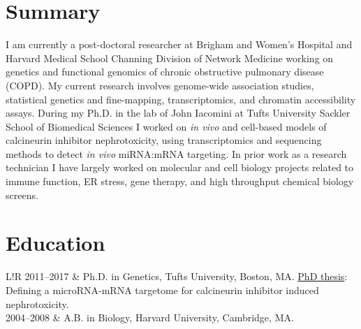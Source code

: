 \documentclass[letterpaper, 10pt]{article}
\newcommand\VRule{\color{lightgray}\vrule width 0.5pt}
\begin{document}
\section*{Summary}

I am currently a post-doctoral researcher at Brigham and Women's Hospital and Harvard Medical School Channing Division of Network Medicine working on genetics and functional genomics of chronic obstructive pulmonary disease (COPD). My current research involves genome-wide association studies, statistical genetics and fine-mapping, transcriptomics, and chromatin accessibility assays.  During my Ph.D. in the lab of John Iacomini at Tufts University Sackler School of Biomedical Sciences I worked on \textit{in vivo} and cell-based models of calcineurin inhibitor nephrotoxicity, using transcriptomics and sequencing methods to detect \textit{in vivo} miRNA:mRNA targeting. In prior work as a research technician I have largely worked on molecular and cell biology projects related to immune function, ER stress, gene therapy, and high throughput chemical biology screens. 

\section*{Education}
\begin{tabular}{L!{\VRule}R}
   2011--2017 & Ph.D. in Genetics, Tufts University, Boston, MA. \href{https://github.com/cbenway/cv/blob/master/phd_thesis.pdf}{PhD thesis}: Defining a microRNA-mRNA targetome for calcineurin inhibitor induced nephrotoxicity.\\
   2004--2008 & A.B. in Biology, Harvard University, Cambridge, MA.
\end{tabular}
\end{document}

